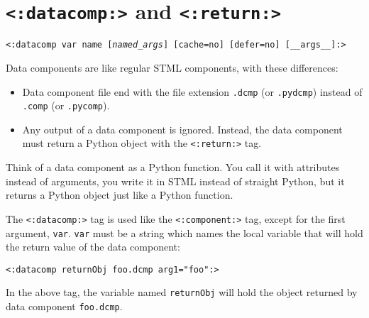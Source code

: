 \documentclass{manual}
\begin{document}



\section{\texttt{<:datacomp:>} and \texttt{<:return:>}}
\label{tagdatacomp}

\texttt{<:datacomp var name [\emph{named_args}] [cache=no] [defer=no] [__args__]:>}

Data components are like regular STML components, with these differences:

\begin{itemize}
\item Data component file end with the file extension \texttt{.dcmp}
(or \texttt{.pydcmp}) instead of \texttt{.comp} (or \texttt{.pycomp}).

\item 
Any output of a data component is ignored. Instead, the data
component must return a Python object with the \texttt{<:return:>}
tag.

\end{itemize}


Think of a data component as a Python function. 
You call it with attributes instead of arguments, you write it 
in STML instead of straight Python, but it returns a Python 
object just like a Python function.

The \texttt{<:datacomp:>} tag is used like the 
\texttt{<:component:>} 
tag, except for the first argument, \texttt{var}. 
\texttt{var} must be a string which names the local 
variable that will hold the return value of the 
data component:

\begin{verbatim}<:datacomp returnObj foo.dcmp arg1="foo":>
\end{verbatim}

In the above tag, the variable named \texttt{returnObj} 
will hold the object returned by data component \texttt{foo.dcmp}.
\end{document}
